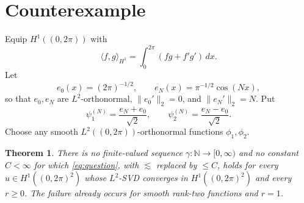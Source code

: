 \documentclass[11pt]{article}
\newtheorem{theorem}{Theorem}
\newcommand{\T}{(0,2\pi)}
\begin{document}
\section{Counterexample}

Equip $H^1(\T)$ with
\[
 \langle f,g\rangle_{H^1}=\int_0^{2\pi}(fg+f'g')\,dx.
\]
Let
\[
 e_0(x)=(2\pi)^{-1/2},
 \qquad e_N(x)=\pi^{-1/2}\cos(Nx),
\]
so that $e_0,e_N$ are $L^2$-orthonormal,
$\|e_0'\|_2=0$, and $\|e_N'\|_2=N$.  Put
\[
 \psi_1^{(N)}=\frac{e_N+e_0}{\sqrt2},
 \qquad
 \psi_2^{(N)}=\frac{e_N-e_0}{\sqrt2}.
\]
Choose any smooth $L^2(\T)$-orthonormal functions $\phi_1,\phi_2$.

\begin{theorem}\label{thm:main}
There is no finite-valued sequence $\gamma:\mathbb N\to[0,\infty)$ and no
constant $C<\infty$ for which \eqref{eq:question}, with $\lesssim$ replaced by
$\leq C$, holds for every $u\in H^1(\T^2)$ whose $L^2$-SVD converges in
$H^1(\T^2)$ and every $r\geq0$.  The failure already occurs for smooth
rank-two functions and $r=1$.
\end{theorem}
\end{document}
